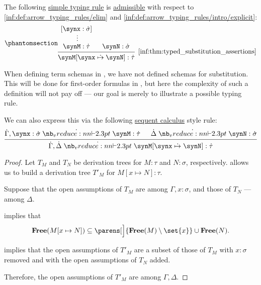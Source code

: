 \begin{proposition}\label{thm:typed_substitution_assertions}
  The following \hyperref[def:simple_typing_rule]{simple typing rule} is \hyperref[con:inference_rule_admissibility]{admissible} with respect to \ref{inf:def:arrow_typing_rules/elim} and \ref{inf:def:arrow_typing_rules/intro/explicit}:
  \begin{equation*}\taglabel[\ensuremath{ Subst }]{inf:thm:typed_substitution_assertions}
    \begin{prooftree}
      \hypo{ [\synx: \syn\sigma] }
      \ellipsis {} { \synM: \syn\tau }

      \hypo{ \synN: \syn\sigma }
      \infer2[\ref{inf:thm:typed_substitution_assertions}]{ \synM[\synx \synsubst \synN]: \syn\tau }.
    \end{prooftree}
  \end{equation*}
\end{proposition}
\begin{comments}
  \item When defining term schemas in , we have not defined schemas for substitution. This will be done for first-order formulas in , but here the complexity of such a definition will not pay off --- our goal is merely to illustrate a possible typing rule.

  \item We can also express this via the following \hyperref[rem:sequent_calculus]{sequent calculus} style rule:
  \begin{equation*}
    \begin{prooftree}
      \hypo{ \syn\Gamma, \synx: \syn\sigma \synvdash \synM: \syn\tau }
      \hypo{ \syn\Delta \synvdash \synN: \syn\sigma }
      \infer2{ \syn\Gamma, \syn\Delta \synvdash \synM[\synx \synsubst \synN]: \syn\tau }.
    \end{prooftree}
  \end{equation*}
\end{comments}
\begin{proof}
  Let \( T_M \) and \( T_N \) be derivation trees for \( M: \tau \) and \( N: \sigma \), respectively.  allows us to build a derivation tree \( T'_M \) for \( M[x \mapsto N]: \tau \).

  Suppose that the open assumptions of \( T_M \) are among \( \Gamma, x: \sigma \), and those of \( T_N \) --- among \( \Delta \).

   implies that
  \begin{equation*}
    \op*{Free}(M[x \mapsto N]) \subseteq \parens[\Big]{ \op*{Free}(M) \setminus \set{ x } } \cup \op*{Free}(N).
  \end{equation*}

   implies that the open assumptions of \( T'_M \) are a subset of those of \( T_M \) with \( x: \sigma \) removed and with the open assumptions of \( T_N \) added.

  Therefore, the open assumptions of \( T'_M \) are among \( \Gamma, \Delta \).
\end{proof}

